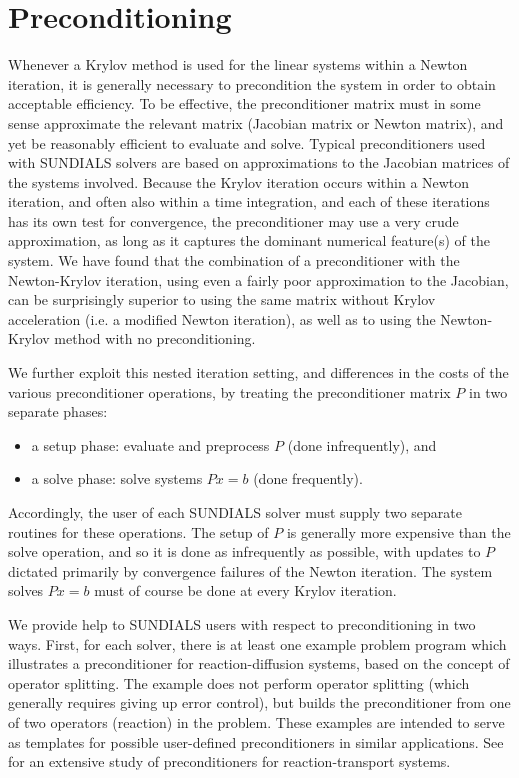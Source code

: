 \section{Preconditioning}\label{s:preconditioning}

Whenever a Krylov method is used for the linear systems within a
Newton iteration, it is generally necessary to precondition the system
in order to obtain acceptable efficiency.  To be effective, the
preconditioner matrix must in some sense approximate the relevant
matrix (Jacobian matrix or Newton matrix), and yet be reasonably
efficient to evaluate and solve.  Typical preconditioners used with
SUNDIALS solvers are based on approximations to the Jacobian matrices
of the systems involved.  Because the Krylov iteration occurs within a
Newton iteration, and often also within a time integration, and each
of these iterations has its own test for convergence, the
preconditioner may use a very crude approximation, as long as it
captures the dominant numerical feature(s) of the system.  
We have found that the combination of a preconditioner with the
Newton-Krylov iteration, using even a fairly poor approximation to
the Jacobian, can be surprisingly superior to using the same matrix
without Krylov acceleration (i.e. a modified Newton iteration), as
well as to using the Newton-Krylov method with no preconditioning.

We further exploit this nested iteration setting, and differences in
the costs of the various preconditioner operations, by treating the
preconditioner matrix $P$ in two separate phases:
\begin{itemize}
\item a setup phase: evaluate and preprocess $P$ (done infrequently), and
\item a solve phase: solve systems $Px = b$ (done frequently).
\end{itemize}
Accordingly, the user of each SUNDIALS solver must supply two separate
routines for these operations.  The setup of $P$ is generally more
expensive than the solve operation, and so it is done as infrequently
as possible, with updates to $P$ dictated primarily by convergence
failures of the Newton iteration.  The system solves $Px = b$ must of
course be done at every Krylov iteration.

We provide help to SUNDIALS users with respect to preconditioning in
two ways.  First, for each solver, there is at least one example
problem program which illustrates a preconditioner for
reaction-diffusion systems, based on the concept of operator
splitting.  The example does not perform operator splitting (which
generally requires giving up error control), but builds the
preconditioner from one of two operators (reaction) in the problem.
These examples are intended to serve as templates for possible
user-defined preconditioners in similar applications.  See
\cite{BrHi:89} for an extensive study of preconditioners for
reaction-transport systems.

